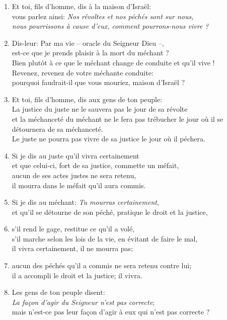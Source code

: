 \documentclass[12pt,a4paper,titlepage]{article}
\def \pslabelsep{0.2em} %
\def \psleftmargin{0em} %
\begin{document}
\begin{enumerate}[leftmargin=\psleftmargin, labelsep = \pslabelsep, label={\arabic*}, font=\color{\pscolor}\small\textsuperscript, parsep=0em, itemsep=0em, topsep=0em ]
\item Et toi, fils d’homme, dis à la maison d’Israël: \\ vous parlez ainsi: \og{}\emph{Nos révoltes et nos péchés sont sur nous, \\ nous pourrissons à cause d’eux, comment pourrons-nous vivre ?}\fg{} 
\item Dis-leur: Par ma vie – oracle du Seigneur Dieu –, \\ est-ce que je prends plaisir à la mort du méchant ? \\ Bien plutôt à ce que le méchant change de conduite et qu’il vive ! \\ Revenez, revenez de votre méchante conduite: \\ pourquoi faudrait-il que vous mouriez, maison d’Israël ? \verseSpace
\item Et toi, fils d’homme, dis aux gens de ton peuple: \\ La justice du juste ne le sauvera pas le jour de sa révolte \\ et la méchanceté du méchant ne le fera pas trébucher le jour où il se détournera de sa méchanceté.\\
Le juste ne pourra pas vivre de sa justice le jour où il péchera.
\item Si je dis au juste qu’il vivra certainement \\ et que celui-ci, fort de sa justice, commette un méfait, \\ aucun de ses actes justes ne sera retenu, \\ il mourra dans le méfait qu’il aura commis.
\item Si je dis au méchant: \og{}\emph{Tu mourras certainement}\fg{}, \\ et qu’il se détourne de son péché, pratique le droit et la justice,
\item s’il rend le gage, restitue ce qu’il a volé, \\ s’il marche selon les lois de la vie, en évitant de faire le mal, \\ il vivra certainement, il ne mourra pas; 
\item aucun des péchés qu’il a commis ne sera retenu contre lui; \\ il a accompli le droit et la justice; il vivra. \verseSpace
\item Les gens de ton peuple disent: \\ \og{}\emph{La façon d’agir du Seigneur n’est pas correcte}\fg{}; \\ mais n’est-ce pas leur façon d’agir à eux qui n’est pas correcte ?

\end{enumerate}
\end{document}
